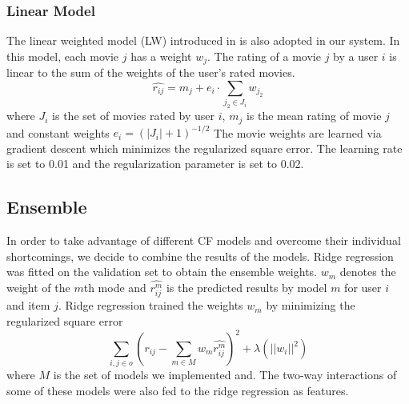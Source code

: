 \documentclass[10pt,conference,compsocconf]{IEEEtran}
\begin{document}
\subsubsection{Linear Model}
The linear weighted model (LW) introduced in \cite{Paterek2007Improving} is also adopted in our system. In this model, each movie $j$ has a weight $w_j$. The rating of a movie $j$ by a user $i$ is linear to the sum of the weights of the user's rated movies.
\[{\hat {r_{ij}}} = {m_j} + {e_i} \cdot \sum\limits_{{j_2} \in {J_i}} {{w_{{j_2}}}} \]
where $J_i$ is the set of movies rated by user $i$, $m_j$ is the mean rating of movie $j$ and constant weights ${e_i} = {(\left| {{J_i}} \right| + 1)^{ - 1/2}}$
The movie weights are learned via gradient descent which minimizes the regularized square error. The learning rate is set to 0.01 and the regularization parameter is set to 0.02.

%

\subsection{Ensemble}
In order to take advantage of different CF models and overcome their individual shortcomings, we decide to combine the results of the models. Ridge regression was fitted on the validation set to obtain the ensemble weights. $w_m$ denotes the weight of the $m$th mode and $\hat{r_{ij}^m}$ is the predicted results by model $m$ for user $i$ and item $j$. Ridge regression trained the weights $w_m$ by minimizing the regularized square error
$$  \sum_{i, j\in o} (r_{ij} - \sum_{m\in M}w_m\hat{r_{ij}^m})^2 + \lambda (||w_i||^2)  $$
where $M$ is the set of models we implemented and. The two-way interactions of some of these models were also fed to the ridge regression as features.
\end{document}
